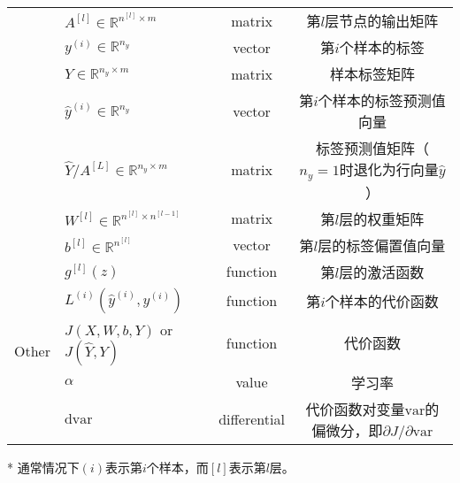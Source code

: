\begin{table}[htb!]
\begin{threeparttable}
\begin{tabular}{clcc}
                                    & $A^{[l]} \in \mathbb{R}^{n^{[l]} \times {m}}$         & matrix               & 第$l$层节点的输出矩阵                                                         \\
                                    & $y^{(i)} \in \mathbb{R}^{n_y}$                        & vector               & 第$i$个样本的标签                                                         \\
                                    & $Y \in {\mathbb{R}^{n_y \times m}}$                   & matrix               & 样本标签矩阵                                                           \\									
                                    & $\hat{y}^{(i)} \in \mathbb{R}^{n_y}$                  & vector               & 第$i$个样本的标签预测值向量                                                \\
                                    & $\hat{Y} / A^{[L]} \in {\mathbb{R}^{n_y \times m}}$   & matrix               & 标签预测值矩阵（$n_y=1$时退化为行向量$\hat{y}$）   						\\
                                    & $W^{[l]} \in \mathbb{R}^{n^{[l]} \times n^{[l-1]}}$   & matrix               & 第$l$层的权重矩阵                                                               \\
                                    & $b^{[l]} \in \mathbb{R}^{n^{[l]}}$                    & vector               & 第$l$层的标签偏置值向量                                                        \\\hline
        \multirow{5}{*}{Other}      & $g^{[l]}(z)$                                          & function             & 第$l$层的激活函数                                                         \\
                                    & $L^{(i)}(\hat{y}^{(i)}, y^{(i)})$                     & function             & 第$i$个样本的代价函数                                                         \\
                                    & $J(X,W,b,Y)$ or $J(\hat{Y},Y)$                        & function             & 代价函数                                                                        \\
                                    & $\alpha$								                & value                & 学习率                                                                        \\
                                    & $\mathrm{d}\mathrm{var}$                              & differential         & 代价函数对变量$\mathrm{var}$的偏微分，即${\partial J}/{\partial \mathrm{var}}$ \\ \hline
    \end{tabular}
    \label{tab:notations} %
    \begin{tablenotes}
        \item[*] 通常情况下$(i)$表示第$i$个样本，而$[l]$表示第$l$层。
    \end{tablenotes}
    \end{threeparttable}
\end{table}

